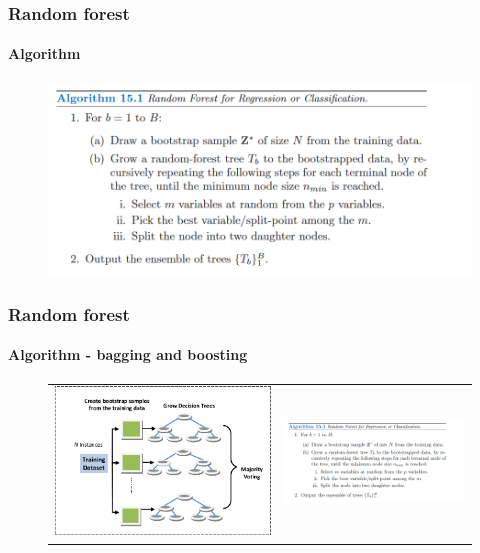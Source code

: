 \begin{frame}
	\frametitle{Random forest}
		\framesubtitle{Algorithm}

	\vfill
	
	\begin{figure}
		\includegraphics[width=12cm]{./figures/algorytm}
	\end{figure}

\end{frame}

\begin{frame}
	\frametitle{Random forest}
		\framesubtitle{Algorithm - bagging and boosting}
	
		\begin{center}
		\begin{figure}[h]
		\begin{tabular}{ll}
		\includegraphics[width=6cm]{./figures/create}
		&
		\includegraphics[width=5cm]{./figures/algorytm}
		\end{tabular}
		\end{figure}
		\end{center}

\end{frame}

